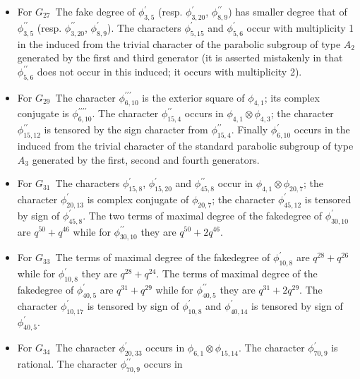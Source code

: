 \begin{itemize}
\item  For $G_{27}$\:\
The   fake  degree  of   $\phi_{3,5}^\prime$  (resp.  $\phi_{3,20}^\prime$,
$\phi_{8,9}^{\prime\prime}$) has smaller degree that of
$\phi_{3,5}^{\prime\prime}$       (resp.      $\phi_{3,20}^{\prime\prime}$,
$\phi_{8,9}^\prime$).     The    characters     $\phi_{5,15}^\prime$    and
$\phi_{5,6}^\prime$  occur  with  multiplicity  1  in  the induced from the
trivial  character of the parabolic subgroup of type $A_2$ generated by the
first  and third generator (it is  asserted mistakenly in \cite{Mal00} that
$\phi_{5,6}^{\prime\prime}$  does not occur in this induced; it occurs with
multiplicity 2).
\item  For $G_{29}$\:\
The  character $\phi_{6,10}^{\prime\prime\prime}$ is the exterior square of
$\phi_{4,1}$; its complex conjugate is
$\phi_{6,10}^{\prime\prime\prime\prime}$. The character
$\phi_{15,4}^{\prime\prime}$  occurs in  $\phi_{4,1}\otimes\phi_{4,3}$; the
character  $\phi_{15,12}^{\prime\prime}$ is tensored  by the sign character
from  $\phi_{15,4}^{\prime\prime}$. Finally  $\phi_{6,10}^\prime$ occurs in
the  induced from the trivial character  of the standard parabolic subgroup
of type $A_3$ generated by the first, second and fourth generators.
\item  For $G_{31}$\:\
The     characters    $\phi_{15,8}^\prime$,    $\phi_{15,20}^\prime$    and
$\phi_{45,8}^{\prime\prime}$  occur in  $\phi_{4,1}\otimes\phi_{20,7}$; the
character  $\phi_{20,13}^\prime$ is complex conjugate of $\phi_{20,7}$; the
character $\phi_{45,12}^\prime$ is tensored by sign of
$\phi_{45,8}^\prime$.  The two terms of maximal degree of the fakedegree of
$\phi_{30,10}^\prime$ are $q^{50}+q^{46}$ while for
$\phi_{30,10}^{\prime\prime}$ they are $q^{50}+2q^{46}$.
\item  For $G_{33}$\:\
The  terms of maximal degree of  the fakedegree of $\phi_{10,8}^\prime$ are
$q^{28}+q^{26}$  while for  $\phi_{10,8}^\prime$ they  are $q^{28}+q^{24}$.
The  terms of maximal degree of  the fakedegree of $\phi_{40,5}^\prime$ are
$q^{31}+q^{29}$    while   for    $\phi_{40,5}^{\prime\prime}$   they   are
$q^{31}+2q^{29}$.  The character $\phi_{10,17}^\prime$  is tensored by sign
of  $\phi_{10,8}^\prime$ and  $\phi_{40,14}^\prime$ is  tensored by sign of
$\phi_{40,5}^\prime$.
\item  For $G_{34}$\:\
The character $\phi_{20,33}^\prime$ occurs in
$\phi_{6,1}\otimes\phi_{15,14}$.   The  character  $\phi_{70,9}^\prime$  is
rational.    The    character    $\phi_{70,9}^{\prime\prime}$   occurs   in

\end{itemize}
